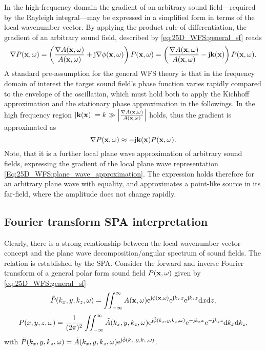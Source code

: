 In the high-frequency domain the gradient of an arbitrary sound field---required by the Rayleigh integral---may be expressed in a simplified form in terms of the local wavenumber vector.
By applying the product rule of differentiation, the gradient of an arbitrary sound field, described by \eqref{eq:25D_WFS:general_sf} reads
\begin{equation}
\nabla P(\mathbf{x},\omega) = \left(  \frac{\nabla A(\mathbf{x},\omega)}{A(\mathbf{x},\omega)} + \mathrm{j} \nabla \phi(\mathbf{x},\omega) \right) P(\mathbf{x},\omega) =  \left(  \frac{\nabla A(\mathbf{x},\omega)}{A(\mathbf{x},\omega)} - \mathrm{j} \mathbf{k}(\mathbf{x}) \right) P(\mathbf{x},\omega).
\end{equation}
A standard pre-assumption for the general WFS theory is that in the frequency domain of interest the target sound field's phase function varies rapidly compared to the envelope of the oscillation, which must hold both to apply the Kichhoff approximation and the stationary phase approximation in the followings.
In the high frequency region $|\mathbf{k}(\mathbf{x})| = k \gg \left| \frac{ \nabla A(\mathbf{x},\omega)}{A(\mathbf{x},\omega)} \right|$ holds, thus the gradient is approximated as
\begin{equation}
\nabla P(\mathbf{x},\omega) \approx - \mathrm{j} \mathbf{k}(\mathbf{x}) P(\mathbf{x},\omega).
\label{eq:25D_WFS:gradient_appr}
\end{equation}
Note, that it is a further local plane wave approximation of arbitrary sound fields, expressing the gradient of the local plane wave representation \eqref{Eq:25D_WFS:plane_wave_approximation}.
The expression holds therefore for an arbitrary plane wave with equality, and approximates a point-like source in its far-field, where the amplitude does not change rapidly.


\subsection{Fourier transform SPA interpretation}
Clearly, there is a strong relationship between the local wavenumber vector concept and the plane wave decomposition/angular spectrum of sound fields.
The relation is established by the SPA.
Consider the forward and inverse Fourier transform of a general polar form sound field $P(\mathbf{x},\omega)$ given by \eqref{eq:25D_WFS:general_sf}
\begin{equation}
\tilde{P}(k_x,y,k_z,\omega) = \iint_{-\infty}^{\infty} A(\mathbf{x},\omega)\mathrm{e}^{\mathrm{j} \phi(\mathbf{x},\omega)} \mathrm{e}^{\mathrm{j} k_x x} \mathrm{e}^{\mathrm{j} k_z z} \mathrm{d} x \mathrm{d} z,
\label{eq:forward_transform}
\end{equation}
\begin{equation}
P(x,y,z,\omega) = \frac{1}{(2\pi)^2} \iint_{-\infty}^{\infty} \tilde{A}(k_x,y,k_z,\omega)\mathrm{e}^{\mathrm{j} \tilde{\phi}(k_x,y,k_z,\omega)}  \mathrm{e}^{-\mathrm{j} k_x x} \mathrm{e}^{-\mathrm{j} k_z z} \mathrm{d} k_x \mathrm{d} k_z,
\label{eq:inverse_transform}
\end{equation}
with $\tilde{P}(k_x,y,k_z,\omega) =\tilde{A}(k_x,y,k_z,\omega)\mathrm{e}^{\mathrm{j} \tilde{\phi}(k_x,y,k_z,\omega)}$.

